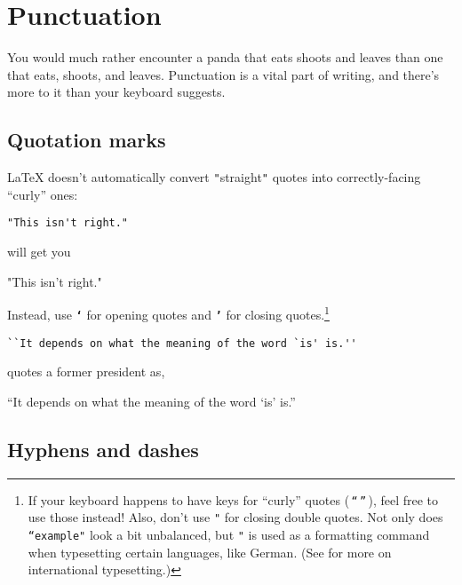 \chapter{Punctuation}
\label{punctuation}

You would much rather encounter a panda that eats
shoots and leaves than one that eats, shoots,
and leaves.\punckern{}
Punctuation is a vital part of writing,
and there's more to it than your keyboard suggests.

\section{Quotation marks}

\LaTeX{} doesn't automatically convert \texttt{"}straight\texttt{"} quotes
into correctly-facing ``curly'' ones:
\begin{leftfigure}
\begin{lstlisting}
"This isn't right."
\end{lstlisting}
\end{leftfigure}
will get you
\begin{leftfigure}
\lm%
"This isn't right."
\end{leftfigure}
Instead, use \texttt{\bfseries `} for opening quotes and \texttt{\bfseries '} for closing
quotes.\punckern\footnote{If your keyboard happens to have keys for
``curly'' quotes (\,\texttt{“}\,\texttt{”}\,), feel free to use those instead!
Also, don't use \texttt{"} for closing double quotes.
Not only does \texttt{``example"} look a bit unbalanced,
but \texttt{"} is used as a formatting command when typesetting certain
languages, like German. (See  for more on international
typesetting.)}
\begin{leftfigure}
\begin{lstlisting}
``It depends on what the meaning of the word `is' is.''
\end{lstlisting}
\end{leftfigure}
quotes a former  president as,
\begin{leftfigure}
\lm%
``It depends on what the meaning of the word `is' is.''
\end{leftfigure}

\section{Hyphens and dashes}

